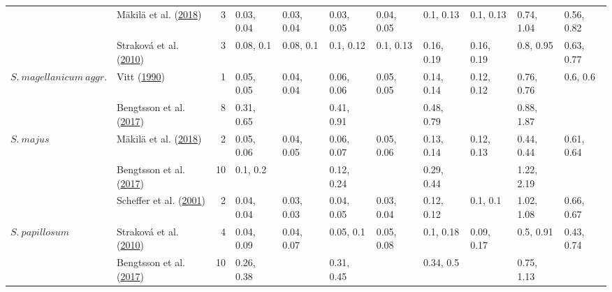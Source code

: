 \documentclass[
  12pt,
]{article}
\begin{document}
\begin{table}[H]
{\begin{tabular}[t]{llrllllllll}
 & Mäkilä et al. (\protect\hyperlink{ref-Makila.2018}{2018}) & 3 & 0.03, 0.04 & 0.03, 0.04 & 0.03, 0.05 & 0.04, 0.05 & 0.1, 0.13 & 0.1, 0.13 & 0.74, 1.04 & 0.56, 0.82\\

 & Straková et al. (\protect\hyperlink{ref-Strakova.2010}{2010}) & 3 & 0.08, 0.1 & 0.08, 0.1 & 0.1, 0.12 & 0.1, 0.13 & 0.16, 0.19 & 0.16, 0.19 & 0.8, 0.95 & 0.63, 0.77\\

\multirow[t]{-4}{*}{\raggedright\arraybackslash $S.~magellanicum~aggr.$} & Vitt (\protect\hyperlink{ref-Vitt.1990}{1990}) & 1 & 0.05, 0.05 & 0.04, 0.04 & 0.06, 0.06 & 0.05, 0.05 & 0.14, 0.14 & 0.12, 0.12 & 0.76, 0.76 & 0.6, 0.6\\
\cmidrule{1-11}
 & Bengtsson et al. (\protect\hyperlink{ref-Bengtsson.2017}{2017}) & 8 & 0.31, 0.65 &  & 0.41, 0.91 &  & 0.48, 0.79 &  & 0.88, 1.87 & \\

\multirow[t]{-2}{*}{\raggedright\arraybackslash $S.~majus$} & Mäkilä et al. (\protect\hyperlink{ref-Makila.2018}{2018}) & 2 & 0.05, 0.06 & 0.04, 0.05 & 0.06, 0.07 & 0.05, 0.06 & 0.13, 0.14 & 0.12, 0.13 & 0.44, 0.44 & 0.61, 0.64\\
\cmidrule{1-11}
 & Bengtsson et al. (\protect\hyperlink{ref-Bengtsson.2017}{2017}) & 10 & 0.1, 0.2 &  & 0.12, 0.24 &  & 0.29, 0.44 &  & 1.22, 2.19 & \\

 & Scheffer et al. (\protect\hyperlink{ref-Scheffer.2001}{2001}) & 2 & 0.04, 0.04 & 0.03, 0.03 & 0.04, 0.05 & 0.03, 0.04 & 0.12, 0.12 & 0.1, 0.1 & 1.02, 1.08 & 0.66, 0.67\\

\multirow[t]{-3}{*}{\raggedright\arraybackslash $S.~papillosum$} & Straková et al. (\protect\hyperlink{ref-Strakova.2010}{2010}) & 4 & 0.04, 0.09 & 0.04, 0.07 & 0.05, 0.1 & 0.05, 0.08 & 0.1, 0.18 & 0.09, 0.17 & 0.5, 0.91 & 0.43, 0.74\\
\cmidrule{1-11}
 & Bengtsson et al. (\protect\hyperlink{ref-Bengtsson.2017}{2017}) & 10 & 0.26, 0.38 &  & 0.31, 0.45 &  & 0.34, 0.5 &  & 0.75, 1.13 & \\


\end{tabular}}
\end{table}
\end{document}
